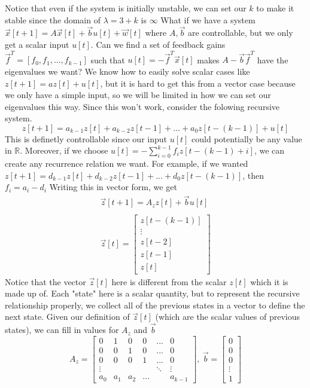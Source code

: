 \documentclass{article}
\begin{document}
Notice that even if the system is initially unstable, we can set our $k$ to make it stable since the domain of $\lambda=3+k$ is $\infty$
What if we have a system $\vec{x}[t+1]=A\vec{x}[t]+\vec{b}u[t]+\vec{w}[t]$ where $A, \vec{b}$ are controllable, but we only get a scalar input $u[t]$.
Can we find a set of feedback gains $\vec{f}^T=[f_0, f_1, ..., f_{k-1}]$ such that $u[t]=-\vec{f}^T\vec{x}[t]$ makes $A-\vec{b}\vec{f}^T$ have the eigenvalues we want?
\break \break
We know how to easily solve scalar cases like $z[t+1]=az[t]+u[t]$, but it is hard to get this from a vector case because we only have a simple input, so we will be limited in how we can set our eigenvalues this way.
Since this won't work, consider the folowing recursive system.
$$z[t+1]=a_{k-1}z[t]+a_{k-2}z[t-1]+...+a_0z[t-(k-1)]+u[t]$$
This is definetly controllable since our input $u[t]$ could potentially be any value in $\mathbb{R}$.
Moreover, if we choose $u[t]=-\sum_{i=0}^{k-1}{f_i z[t-(k-1)+i]}$, we can create any recurrence relation we want.
For example, if we wanted $z[t+1]=d_{k-1}z[t]+d_{k-2}z[t-1]+...+d_0z[t-(k-1)]$, then $f_i=a_i-d_i$
Writing this in vector form, we get
\[
    \begin{array}{c}
    \vec{z}[t+1]=A_z z[t]+\vec{b}u[t] \\
    \\
    \vec{z}[t] = \left[
        \begin{array}{c}
            z[t-(k-1)]\\
            \vdots\\
            z[t-2]\\
            z[t-1]\\
            z[t]
        \end{array}
    \right]
    \end{array}
\]
Notice that the vector $\vec{z}[t]$ here is different from the scalar $z[t]$ which it is made up of. Each "state" here is a scalar quantity, but to represent the recursive relationship properly, we collect all of the previous states in a vector to define the next state.
\break\break
Given our definition of $\vec{z}[t]$ (which are the scalar values of previous states), we can fill in values for $A_z$ and $\vec{b}$
\[
    A_z = \left[
        \begin{array}{cccccc}
            0 & 1 & 0 & 0 & ... & 0\\
            0 & 0 & 1 & 0 & ... & 0\\
            0 & 0 & 0 & 1 & ... & 0\\
            \vdots & & & & \ddots & \vdots\\
            a_0 & a_1 & a_2 & ... & & a_{k-1}
        \end{array}
    \right],\>
    \vec{b} = \left[
        \begin{array}{c}
            0\\
            0\\
            0\\
            \vdots\\
            1
        \end{array}
    \right]
\]
\end{document}
